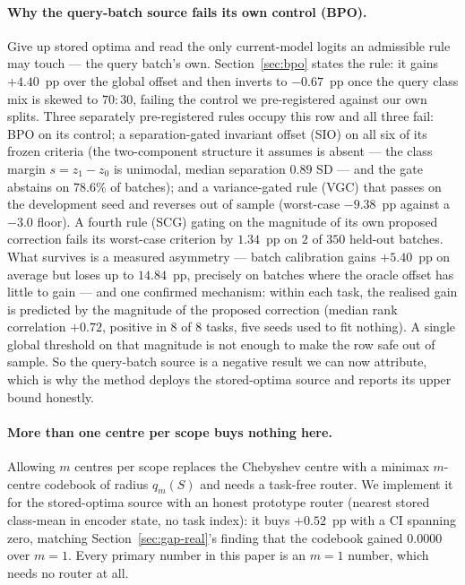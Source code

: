 \paragraph{Why the query-batch source fails its own control (BPO).}
Give up stored optima and read the only current-model logits an admissible rule
may touch --- the query batch's own. Section~\ref{sec:bpo} states the rule: it
gains $+4.40$~pp over the global offset and then inverts to $-0.67$~pp once the
query class mix is skewed to $70{:}30$, failing the control we pre-registered
against our own splits. Three separately pre-registered rules occupy this row and
all three fail: BPO on its control; a separation-gated invariant offset (SIO) on
all six of its frozen criteria (the two-component structure it assumes is absent
--- the class margin $s=z_1-z_0$ is unimodal, median separation $0.89$ SD --- and
the gate abstains on $78.6\%$ of batches); and a variance-gated rule (VGC) that
passes on the development seed and reverses out of sample (worst-case $-9.38$~pp
against a $-3.0$ floor). A fourth rule (SCG) gating on the magnitude of its own
proposed correction fails its worst-case criterion by $1.34$~pp on $2$ of $350$
held-out batches. What survives is a measured asymmetry --- batch calibration gains
$+5.40$~pp on average but loses up to $14.84$~pp, precisely on batches where the
oracle offset has little to gain --- and one confirmed mechanism: within each task,
the realised gain is predicted by the magnitude of the proposed correction (median
rank correlation $+0.72$, positive in $8$ of $8$ tasks, five seeds used to fit
nothing). A single global threshold on that magnitude is not enough to make the
row safe out of sample. So the query-batch source is a negative result we can now
attribute, which is why the method deploys the stored-optima source and reports its
upper bound honestly.

\paragraph{More than one centre per scope buys nothing here.}
Allowing $m$ centres per scope replaces the Chebyshev centre with a minimax
$m$-centre codebook of radius $q_m(S)$ and needs a task-free router. We implement
it for the stored-optima source with an honest prototype router (nearest stored
class-mean in encoder state, no task index): it buys $+0.52$~pp with a CI spanning
zero, matching Section~\ref{sec:gap-real}'s finding that the codebook gained
$0.0000$ over $m=1$. Every primary number in this paper is an $m=1$ number, which
needs no router at all.
